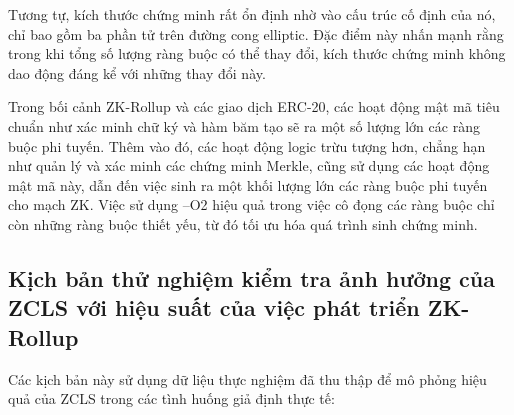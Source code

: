     Tương tự, kích thước chứng minh rất ổn định nhờ vào cấu trúc cố định của nó, chỉ bao gồm ba phần tử trên đường cong elliptic. Đặc điểm này nhấn mạnh rằng trong khi tổng số lượng ràng buộc có thể thay đổi, kích thước chứng minh không dao động đáng kể với những thay đổi này.

    Trong bối cảnh ZK-Rollup và các giao dịch ERC-20, các hoạt động mật mã tiêu chuẩn như xác minh chữ ký và hàm băm tạo sẽ ra một số lượng lớn các ràng buộc phi tuyến. Thêm vào đó, các hoạt động logic trừu tượng hơn, chẳng hạn như quản lý và xác minh các chứng minh Merkle, cũng sử dụng các hoạt động mật mã này, dẫn đến việc sinh ra một khối lượng lớn các ràng buộc phi tuyến cho mạch ZK. Việc sử dụng --O2 hiệu quả trong việc cô đọng các ràng buộc chỉ còn những ràng buộc thiết yếu, từ đó tối ưu hóa quá trình sinh chứng minh.
    
    

    \subsection{Kịch bản thử nghiệm kiểm tra ảnh hưởng của ZCLS với hiệu suất của việc phát triển ZK-Rollup}

    Các kịch bản này sử dụng dữ liệu thực nghiệm đã thu thập để mô phỏng hiệu quả của ZCLS trong
    các tình huống giả định thực tế:
    
